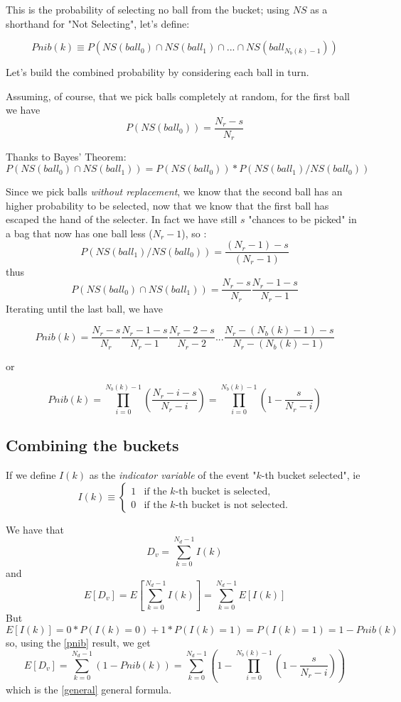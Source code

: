 \documentclass[12pt]{article}
\begin{document}
This is the probability of selecting no ball from the bucket; using $NS$ as a shorthand for "Not Selecting", let's define:

$$Pnib(k) \equiv P(NS(ball_0) \cap NS(ball_1) \cap ... \cap NS(ball_{N_b(k)-1}))$$

Let's build the combined probability by considering each ball in turn.

Assuming, of course, that we pick balls completely at random, for the first ball we have
$$P(NS(ball_0))=\frac{N_r-s}{N_r}$$

Thanks to Bayes' Theorem:
$$P(NS(ball_0) \cap NS(ball_1)) = P(NS(ball_0)) * P( NS(ball_1) / NS(ball_0) )$$

Since we pick balls {\em without replacement}, we know that the second ball has an higher probability to be selected, now that we know that the first ball has escaped the hand of the selecter. In fact we have still $s$ "chances to be picked" in a bag that now has one ball less ($N_r-1$), so :
$$P( NS(ball_1) / NS(ball_0) ) = \frac{(N_r-1)-s}{(N_r-1)}$$
thus
$$P(NS(ball_0) \cap NS(ball_1)) = \frac{N_r-s}{N_r} \frac{N_r-1-s}{N_r-1}$$
Iterating until the last ball, we have

$$Pnib(k) = \frac{N_r-s}{N_r} \frac{N_r-1-s}{N_r-1} \frac{N_r-2-s}{N_r-2}... \frac{N_r-(N_b(k)-1)-s}{N_r-(N_b(k)-1)} $$

or

\begin{equation}\label{pnib}\boxed{
Pnib(k) = \prod_{i=0}^{N_b(k)-1} 
          { \left(\frac{N_r-i-s}{N_r-i} \right) 
          } 
     = \prod_{i=0}^{N_b(k)-1} 
          { \left(1 - \frac{s}{N_r-i} \right) 
          }
 }
\end{equation}

\subsection{Combining the buckets}

If we define $I(k)$ as the {\em indicator variable} of the event "$k$-th bucket selected", ie 
$$I(k)\equiv\begin{cases}
          1 & \text{if the $k$-th bucket is selected},\\
          0 & \text{if the $k$-th bucket is not selected}.
          \end{cases}
$$

We have that 
$$D_v=\sum_{k=0}^{N_d-1}{I(k)}$$
and
$$E[D_v]=E\left[\sum_{k=0}^{N_d-1}{I(k)}\right]=\sum_{k=0}^{N_d-1}{E\left[I(k)\right]}$$
But
$$E\left[I(k)\right]=0 * P(I(k)=0) + 1 * P(I(k)=1)=P(I(k)=1)=1-Pnib(k)$$
so, using the \eqref{pnib} result, we get
$$E[D_v]
= \sum_{k=0}^{N_d-1}{ \left( 1-Pnib(k) \right)}
= \sum_{k=0}^{N_d-1}{ \left( 1- \prod_{i=0}^{N_b(k)-1} 
          { \left(1 - \frac{s}{N_r-i} \right) 
          }  \right)
          }$$
which is the \eqref{general} general formula.
\end{document}
